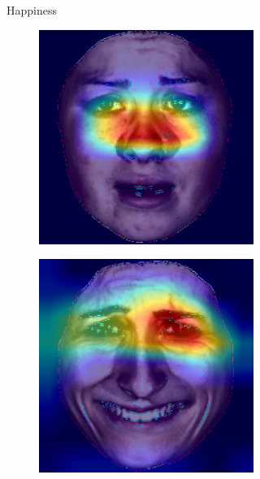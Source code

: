 \begin{figure}[ht]
\begin{subfigure}{0.45\textwidth}
\begin{subfigure}{0.45\textwidth}
        \end{subfigure}
        \caption{Happiness}
    \end{subfigure}
    \hspace{0.05\textwidth} %
    \begin{subfigure}{0.45\textwidth}
        \centering
        \begin{subfigure}{0.45\textwidth}
            \includegraphics[width=\linewidth]{Images/Heatmaps/heatmap_fear_1.png}
        \end{subfigure}
        \begin{subfigure}{0.45\textwidth}
            \includegraphics[width=\linewidth]{Images/Heatmaps/heatmap_fear_2.png}

\end{subfigure}
\end{subfigure}
\end{figure}
